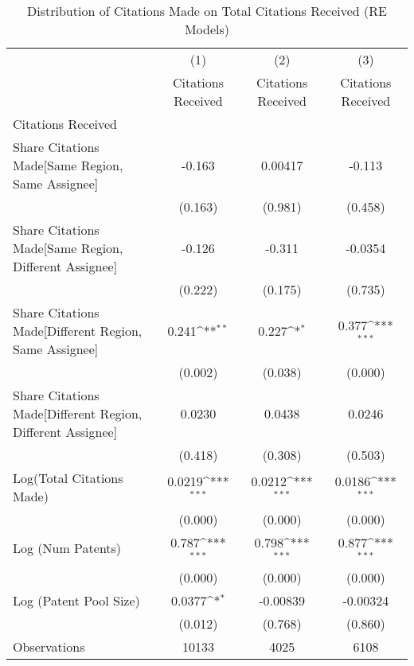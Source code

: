 {
\def\sym#1{\ifmmode^{#1}\else\(^{#1}\)\fi}
\begin{longtable}{l*{3}{c}}
\caption{Distribution of Citations Made on Total Citations Received (RE Models) \label{model101112}}\\
\hline\hline\endfirsthead\hline\endhead\hline\endfoot\endlastfoot
                &\multicolumn{1}{c}{(1)}&\multicolumn{1}{c}{(2)}&\multicolumn{1}{c}{(3)}\\
                &\multicolumn{1}{c}{Citations Received}&\multicolumn{1}{c}{Citations Received}&\multicolumn{1}{c}{Citations Received}\\
\hline
Citations Received&                  &                  &                  \\
Share Citations Made[Same Region, Same Assignee]&   -0.163         &  0.00417         &   -0.113         \\
                &  (0.163)         &  (0.981)         &  (0.458)         \\
Share Citations Made[Same Region, Different Assignee]&   -0.126         &   -0.311         &  -0.0354         \\
                &  (0.222)         &  (0.175)         &  (0.735)         \\
Share Citations Made[Different Region, Same Assignee]&    0.241\sym{**} &    0.227\sym{*}  &    0.377\sym{***}\\
                &  (0.002)         &  (0.038)         &  (0.000)         \\
Share Citations Made[Different Region, Different Assignee]&   0.0230         &   0.0438         &   0.0246         \\
                &  (0.418)         &  (0.308)         &  (0.503)         \\
Log(Total Citations Made)&   0.0219\sym{***}&   0.0212\sym{***}&   0.0186\sym{***}\\
                &  (0.000)         &  (0.000)         &  (0.000)         \\
Log (Num Patents)&    0.787\sym{***}&    0.798\sym{***}&    0.877\sym{***}\\
                &  (0.000)         &  (0.000)         &  (0.000)         \\
Log (Patent Pool Size)&   0.0377\sym{*}  & -0.00839         & -0.00324         \\
                &  (0.012)         &  (0.768)         &  (0.860)         \\
\hline
Observations    &    10133         &     4025         &     6108         \\

\end{longtable}}
